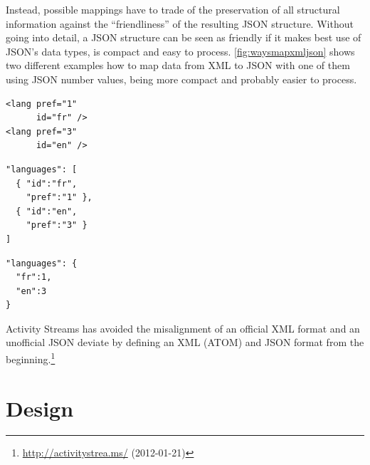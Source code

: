 \documentclass[12pt,a4paper,twoside]{scrartcl}		%
\newcommand{\citeurl}[2]{\url{#1} (#2)}
\begin{document}
Instead, possible mappings have to trade of the preservation of all structural
information against the ``friendliness'' of the resulting JSON
structure\cite{Boyer2011}. Without going into detail, a JSON structure can be
seen as friendly if it makes best use of JSON's data types, is compact and easy
to process. \autoref{fig:waysmapxmljson} shows two different examples how to map
data from XML to JSON with one of them using JSON number values, being more
compact and probably easier to process.

\begin{multicols}{3}
\begin{lstlisting}[label=fig:waysmapxmljson,
                  captionpos=t,
                  caption={XML fragment}, frame=single]
<lang pref="1"
      id="fr" />
<lang pref="3"
      id="en" />
\end{lstlisting}
\columnbreak
\begin{lstlisting}[title={unfriendly JSON}, frame=single,
                  captionpos=t
]
"languages": [
  { "id":"fr",
    "pref":"1" },
  { "id":"en",
    "pref":"3" }
]
\end{lstlisting}
\columnbreak
\begin{lstlisting}[title={friendly JSON}, frame=single,
                  captionpos=t
]
"languages": {
  "fr":1,
  "en":3
}
\end{lstlisting}
\end{multicols}

Activity Streams has avoided the misalignment of an official XML format and an unofficial JSON deviate by defining an XML (ATOM) and JSON format from the beginning.\footnote{\citeurl{http://activitystrea.ms/}{2012-01-21}}






\section{Design}


\end{document}
